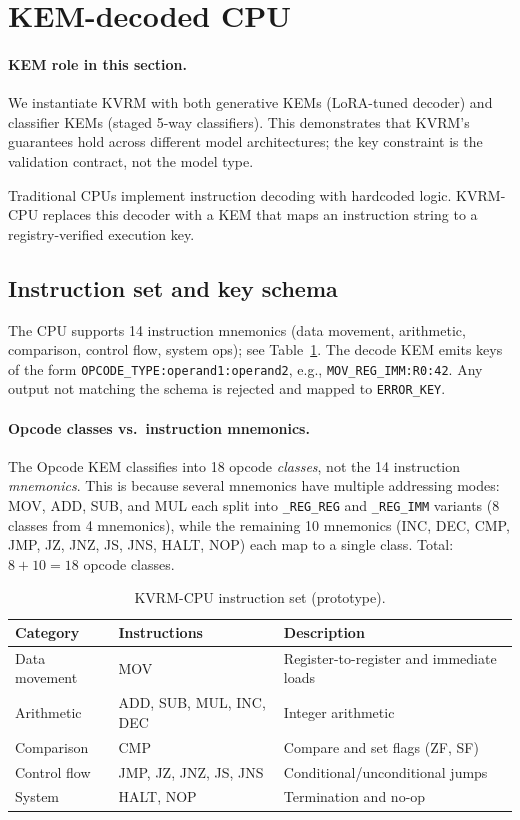 \documentclass[11pt]{article}
\begin{document}
\section{KEM-decoded CPU}\label{sec:cpu}

\paragraph{KEM role in this section.}
We instantiate KVRM with both generative KEMs (LoRA-tuned decoder) and classifier KEMs (staged 5-way classifiers). This demonstrates that KVRM's guarantees hold across different model architectures; the key constraint is the validation contract, not the model type.

Traditional CPUs implement instruction decoding with hardcoded logic. KVRM-CPU replaces this decoder with a KEM that maps an instruction string to a registry-verified execution key.

\subsection{Instruction set and key schema}
The CPU supports 14 instruction mnemonics (data movement, arithmetic, comparison, control flow, system ops); see Table~\ref{tab:isa}.
The decode KEM emits keys of the form \texttt{OPCODE\_TYPE:operand1:operand2}, e.g., \texttt{MOV\_REG\_IMM:R0:42}.
Any output not matching the schema is rejected and mapped to \texttt{ERROR\_KEY}.

\paragraph{Opcode classes vs.\ instruction mnemonics.}
The Opcode KEM classifies into 18 opcode \emph{classes}, not the 14 instruction \emph{mnemonics}.
This is because several mnemonics have multiple addressing modes: MOV, ADD, SUB, and MUL each split into \texttt{\_REG\_REG} and \texttt{\_REG\_IMM} variants (8 classes from 4 mnemonics), while the remaining 10 mnemonics (INC, DEC, CMP, JMP, JZ, JNZ, JS, JNS, HALT, NOP) each map to a single class.
Total: $8 + 10 = 18$ opcode classes.

\begin{table}[h]
\centering
\caption{KVRM-CPU instruction set (prototype).}
\label{tab:isa}
\begin{tabular}{llp{7.2cm}}
\toprule
Category & Instructions & Description \\
\midrule
Data movement & MOV & Register-to-register and immediate loads \\
Arithmetic & ADD, SUB, MUL, INC, DEC & Integer arithmetic \\
Comparison & CMP & Compare and set flags (ZF, SF) \\
Control flow & JMP, JZ, JNZ, JS, JNS & Conditional/unconditional jumps \\
System & HALT, NOP & Termination and no-op \\
\bottomrule
\end{tabular}
\end{table}
\end{document}
